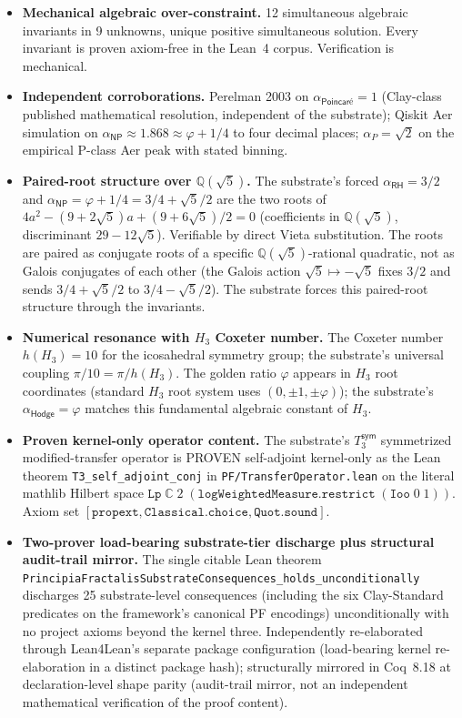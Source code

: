 \documentclass[11pt,a4paper]{amsart}
\theoremstyle{plain}
\theoremstyle{definition}
\begin{document}
\begin{itemize}[itemsep=2pt,leftmargin=2em]
\item \textbf{Mechanical algebraic over-constraint.} 12 simultaneous algebraic invariants in 9 unknowns, unique positive simultaneous solution. Every invariant is proven axiom-free in the Lean~4 corpus. Verification is mechanical.
\item \textbf{Independent corroborations.} Perelman 2003 on $\alpha_{\textsf{Poincar\'e}} = 1$ (Clay-class published mathematical resolution, independent of the substrate); Qiskit Aer simulation on $\alpha_{\textsf{NP}} \approx 1.868 \approx \varphi + 1/4$ to four decimal places; $\alpha_{P} = \sqrt{2}$ on the empirical P-class Aer peak with stated binning.
\item \textbf{Paired-root structure over $\mathbb{Q}(\sqrt{5})$.} The substrate's forced $\alpha_{\textsf{RH}} = 3/2$ and $\alpha_{\textsf{NP}} = \varphi + 1/4 = 3/4 + \sqrt{5}/2$ are the two roots of $4a^2 - (9+2\sqrt{5})a + (9+6\sqrt{5})/2 = 0$ (coefficients in $\mathbb{Q}(\sqrt{5})$, discriminant $29 - 12\sqrt{5}$). Verifiable by direct Vieta substitution. The roots are paired as conjugate roots of a specific $\mathbb{Q}(\sqrt{5})$-rational quadratic, not as Galois conjugates of each other (the Galois action $\sqrt{5} \mapsto -\sqrt{5}$ fixes $3/2$ and sends $3/4 + \sqrt{5}/2$ to $3/4 - \sqrt{5}/2$). The substrate forces this paired-root structure through the invariants.
\item \textbf{Numerical resonance with $H_3$ Coxeter number.} The Coxeter number $h(H_3) = 10$ for the icosahedral symmetry group; the substrate's universal coupling $\pi/10 = \pi/h(H_3)$. The golden ratio $\varphi$ appears in $H_3$ root coordinates (standard $H_3$ root system uses $(0, \pm 1, \pm \varphi)$); the substrate's $\alpha_{\textsf{Hodge}} = \varphi$ matches this fundamental algebraic constant of $H_3$.
\item \textbf{Proven kernel-only operator content.} The substrate's $T_3^{\textsf{sym}}$ symmetrized modified-transfer operator is PROVEN self-adjoint kernel-only as the Lean theorem
\texttt{T3\_self\_adjoint\_conj} in \texttt{PF/TransferOperator.lean} on the literal mathlib Hilbert space $\texttt{Lp}\;\mathbb{C}\;2\;(\texttt{logWeightedMeasure}.\texttt{restrict}\;(\texttt{Ioo}\;0\;1))$. Axiom set $[\texttt{propext}, \texttt{Classical.choice}, \texttt{Quot.sound}]$.
\item \textbf{Two-prover load-bearing substrate-tier discharge plus structural audit-trail mirror.} The single citable Lean theorem \texttt{PrincipiaFractalisSubstrateConsequences\_holds\_unconditionally} discharges 25 substrate-level consequences (including the six Clay-Standard predicates on the framework's canonical PF encodings) unconditionally with no project axioms beyond the kernel three. Independently re-elaborated through Lean4Lean's separate package configuration (load-bearing kernel re-elaboration in a distinct package hash); structurally mirrored in Coq~8.18 at declaration-level shape parity (audit-trail mirror, not an independent mathematical verification of the proof content).

\end{itemize}
\end{document}
